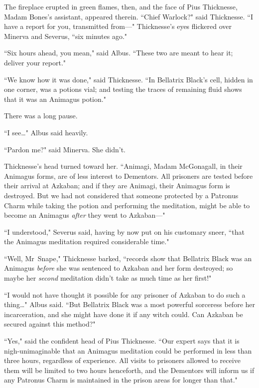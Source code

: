 The fireplace erupted in green flames, then, and the face of Pius Thicknesse, Madam Bones's assistant, appeared therein. ``Chief Warlock?" said Thicknesse. ``I have a report for you, transmitted from—" Thicknesse's eyes flickered over Minerva and Severus, ``six minutes ago."

``Six hours ahead, you mean," said Albus. ``These two are meant to hear it; deliver your report."

``We know how it was done," said Thicknesse. ``In Bellatrix Black's cell, hidden in one corner, was a potions vial; and testing the traces of remaining fluid shows that it was an Animagus potion."

There was a long pause.

``I see{\ldots}" Albus said heavily.

``Pardon me?" said Minerva. She didn't.

Thicknesse's head turned toward her. ``Animagi, Madam McGonagall, in their Animagus forms, are of less interest to Dementors. All prisoners are tested before their arrival at Azkaban; and if they are Animagi, their Animagus form is destroyed. But we had not considered that someone protected by a Patronus Charm while taking the potion and performing the meditation, might be able to become an Animagus \emph{after} they went to Azkaban—"

``I understood," Severus said, having by now put on his customary sneer, ``that the Animagus meditation required considerable time."

``Well, Mr~Snape," Thicknesse barked, ``records show that Bellatrix Black was an Animagus \emph{before} she was sentenced to Azkaban and her form destroyed; so maybe her \emph{second} meditation didn't take as much time as her first!"

``I would not have thought it possible for any prisoner of Azkaban to do such a thing{\ldots}" Albus said. ``But Bellatrix Black was a most powerful sorceress before her incarceration, and she might have done it if any witch could. Can Azkaban be secured against this method?"

``Yes," said the confident head of Pius Thicknesse. ``Our expert says that it is nigh-unimaginable that an Animagus meditation could be performed in less than three hours, regardless of experience. All visits to prisoners allowed to receive them will be limited to two hours henceforth, and the Dementors will inform us if any Patronus Charm is maintained in the prison areas for longer than that."

